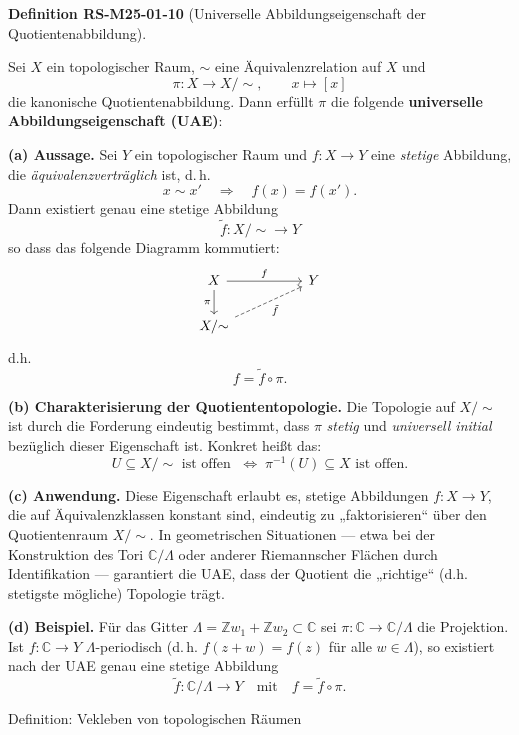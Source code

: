 \documentclass[10pt, letterpaper]{article}
\newcommand{\CustomHeading}[3]{%
  \par\medskip\noindent%
  \textbf{#1 #2} \textnormal{(#3)}.\enskip%
}
\newenvironment{DEF}[2]{\begin{unitbox}\CustomHeading{Definition}{#1}{#2}}{\end{unitbox}}
\begin{document}
\begin{DEF}{RS-M25-01-10}{Universelle Abbildungseigenschaft der Quotientenabbildung}
Sei $X$ ein topologischer Raum, $\sim$ eine Äquivalenzrelation auf $X$ und 
\[
\pi : X \longrightarrow X/{\sim}, \qquad x \longmapsto [x]
\]
die kanonische Quotientenabbildung.  
Dann erfüllt $\pi$ die folgende \textbf{universelle Abbildungseigenschaft (UAE)}:

\textbf{(a) Aussage.}  
Sei $Y$ ein topologischer Raum und $f : X \to Y$ eine \emph{stetige} Abbildung, die \emph{äquivalenzverträglich} ist, d.\,h.
\[
x \sim x' \quad \Longrightarrow \quad f(x) = f(x').
\]
Dann existiert genau eine stetige Abbildung
\[
\tilde{f} : X/{\sim} \longrightarrow Y
\]
so dass das folgende Diagramm kommutiert:
\[
\begin{tikzcd}
X \arrow[rr, "f"] \arrow[d, "\pi"'] & & Y \\
X/{\sim} \arrow[urr, "\tilde{f}"', dashed]
\end{tikzcd}
\]
d.h.
\[
f = \tilde{f} \circ \pi.
\]

\textbf{(b) Charakterisierung der Quotiententopologie.}  
Die Topologie auf $X/{\sim}$ ist durch die Forderung eindeutig bestimmt, dass $\pi$ \emph{stetig} und \emph{universell initial} bezüglich dieser Eigenschaft ist.  
Konkret heißt das:
\[
U \subseteq X/{\sim} \text{ ist offen } 
\;\Longleftrightarrow\; 
\pi^{-1}(U) \subseteq X \text{ ist offen}.
\]

\textbf{(c) Anwendung.}  
Diese Eigenschaft erlaubt es, stetige Abbildungen $f : X \to Y$, die auf Äquivalenzklassen konstant sind, eindeutig zu „faktorisieren“ über den Quotientenraum $X/{\sim}$.  
In geometrischen Situationen — etwa bei der Konstruktion des Tori $\mathbb{C}/\Lambda$ oder anderer Riemannscher Flächen durch Identifikation — garantiert die UAE, dass der Quotient die „richtige“ (d.h. stetigste mögliche) Topologie trägt.

\textbf{(d) Beispiel.}  
Für das Gitter $\Lambda = \mathbb{Z}w_{1} + \mathbb{Z}w_{2} \subset \mathbb{C}$ sei $\pi : \mathbb{C} \to \mathbb{C}/\Lambda$ die Projektion.  
Ist $f : \mathbb{C} \to Y$ $\Lambda$-periodisch (d.\,h. $f(z+w) = f(z)$ für alle $w \in \Lambda$), so existiert nach der UAE genau eine stetige Abbildung
\[
\tilde{f} : \mathbb{C}/\Lambda \longrightarrow Y
\quad \text{mit} \quad f = \tilde{f} \circ \pi.
\]
\end{DEF}


Definition: Vekleben von topologischen Räumen
\end{document}
